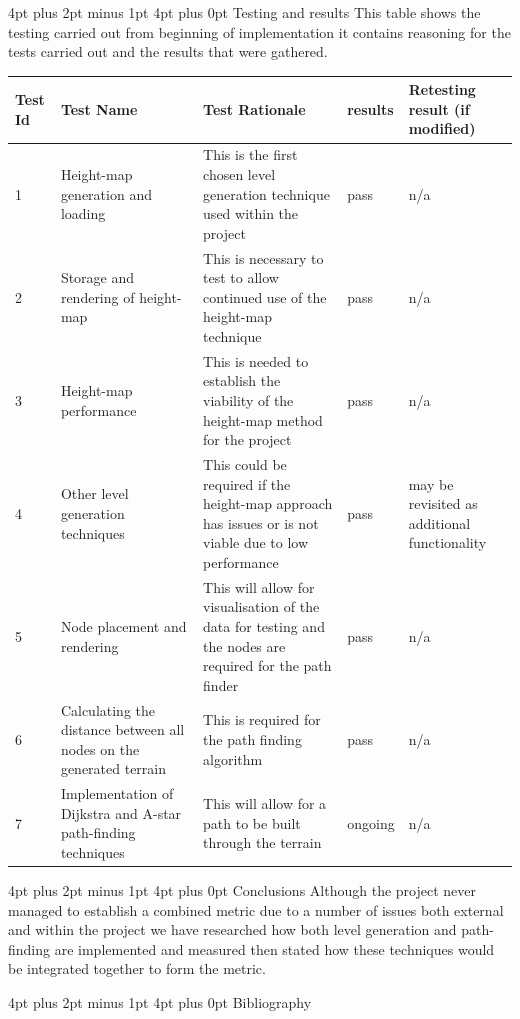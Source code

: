 \documentclass[12pt,a4paper]{article}
\makeatletter
\renewcommand\section{\@startsection {section}{1}{0mm} %
                               {4pt plus 2pt minus 1pt} %
                               {4pt plus 0pt} %
                               {\bfseries}}
\makeatother
\begin{document}
\section{Testing and results}
This table shows the testing carried out from  beginning of implementation it contains reasoning for the tests carried out and the results that were gathered.\\
\begin{tabular}{|p{0.8cm}|p{2cm}|p{5cm}|p{1.4cm}|p{2cm}|}
\hline
Test Id & Test Name & Test Rationale & results & Retesting result (if modified) \\
\hline
1 & Height-map generation and loading & This is the first chosen level generation technique used within the project & pass & n/a\\
\hline
2 & Storage and rendering of height-map & This is necessary to test to allow continued use of the height-map technique & pass & n/a\\
\hline
3 & Height-map performance & This is needed to establish the viability of the height-map method for the project & pass & n/a\\ 
\hline
4 & Other level generation techniques & This could be required if the height-map approach has issues or is not viable due to low performance & pass & may be revisited as additional functionality\\
\hline
5 & Node placement and rendering & This will allow for visualisation of the data for testing and the nodes are required for the path finder & pass & n/a\\ 
\hline
6 & Calculating the distance between all nodes on the generated terrain  & This is required for the path finding algorithm & pass & n/a\\
\hline
7 & Implementation of Dijkstra and A-star path-finding techniques &This will allow for a path to be built through the terrain & ongoing & n/a\\
\hline   
\end{tabular} 
\newpage
\section{Conclusions}
Although the project never managed to establish a combined metric due to a number of issues both external and within the project we have researched how both level generation and path-finding are implemented and measured then stated how these techniques would be integrated together to form the metric.   

\section{Bibliography}


\end{document}
